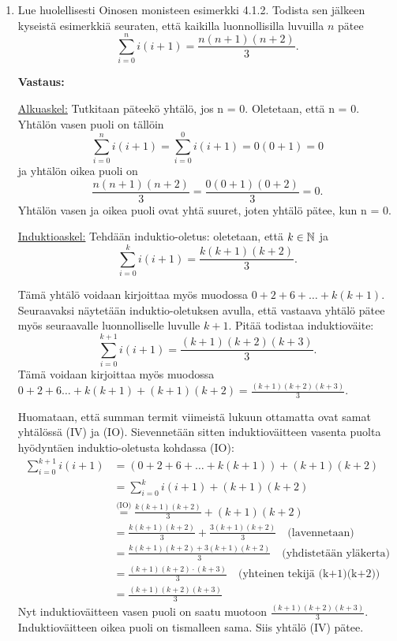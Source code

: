 \documentclass[a4paper,12pt]{article}
\begin{document}
\begin{enumerate}

\item Lue huolellisesti Oinosen monisteen esimerkki 4.1.2. Todista sen j\"alkeen kyseist\"a esimerkki\"a seuraten, ett\"a kaikilla luonnollisilla luvuilla $n$ p\"atee
$$\sum_{i=0}^n i(i+1)=\frac{n(n+1)(n+2)}{3}.$$

\textbf{Vastaus: }

\underline{Alkuaskel:} Tutkitaan päteekö yhtälö, jos n = 0.
Oletetaan, että n = 0. Yhtälön vasen puoli on tällöin
$$\sum_{i=0}^n i(i+1) = \sum_{i=0}^0 i(i+1) = 0(0+1) = 0$$
ja yhtälön oikea puoli on 
$$\frac{n(n+1)(n+2)}{3}=\frac{0(0+1)(0+2)}{3}=0.$$ 
Yhtälön vasen ja oikea puoli ovat yhtä suuret, joten yhtälö pätee, kun n = 0.

\underline{Induktioaskel:} Tehdään induktio-oletus: oletetaan, että $k \in \mathbb{N}$ ja
\begin{equation*}
    \sum_{i=0}^k i(i+1)=\frac{k(k+1)(k+2)}{3}. \tag{IO}
\end{equation*}

Tämä yhtälö voidaan kirjoittaa myös muodossa $0+2+6+\dots +k(k+1)$. 
Seuraavaksi näytetään induktio-oletuksen avulla, että vastaava yhtälö pätee myös seuraavalle luonnolliselle luvulle $k+1$. Pitää todistaa induktioväite:
\begin{equation*}
    \sum_{i=0}^{k+1}i(i+1)=\frac{(k+1)(k+2)(k+3)}{3}. \tag{IV}
\end{equation*}
Tämä voidaan kirjoittaa myös muodossa $0+2+6\dots+k(k+1)+(k+1)(k+2)=\frac{(k+1)(k+2)(k+3)}{3}.$

Huomataan, että summan termit viimeistä lukuun ottamatta ovat samat yhtälössä (IV) ja (IO). Sievennetään sitten induktioväitteen vasenta puolta hyödyntäen induktio-oletusta kohdassa (IO):
\begin{align*}
    \sum_{i=0}^{k+1}i(i+1) & =(0+2+6+\dots +k(k+1))+(k+1)(k+2) \\
    & =\sum_{i=0}^ki(i+1)+(k+1)(k+2) \\
    &\stackrel{\text{(IO)}}{=}\frac{k(k+1)(k+2)}{3}+(k+1)(k+2) \\
    &=\frac{k(k+1)(k+2)}{3}+\frac{3(k+1)(k+2)}{3} \quad\text{(lavennetaan)} \\
    &=\frac{k(k+1)(k+2)+3(k+1)(k+2)}{3} \quad\text{(yhdistetään yläkerta)} \\
    &=\frac{(k+1)(k+2)\cdot (k+3)}{3} \quad\text{(yhteinen tekijä (k+1)(k+2))} \\
    &=\frac{(k+1)(k+2)(k+3)}{3}
\end{align*}
Nyt induktioväitteen vasen puoli on saatu muotoon $\frac{(k+1)(k+2)(k+3)}{3}$. Induktioväitteen oikea puoli on tismalleen sama. Siis yhtälö (IV) pätee. 


\end{enumerate}
\end{document}
